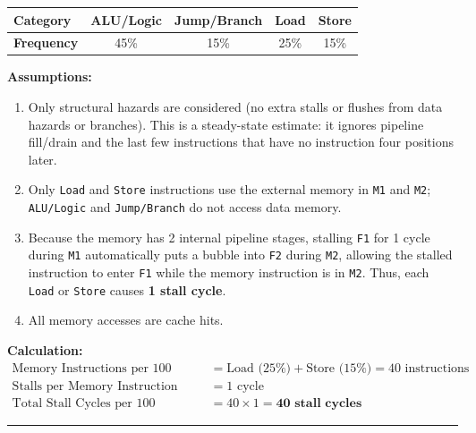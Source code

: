\documentclass[11pt, a4paper]{article}
\begin{document}
\begin{center}
\begin{tabular}{@{}l c c c c@{}}
\toprule
\textbf{Category} & \textbf{ALU/Logic} & \textbf{Jump/Branch} & \textbf{Load} & \textbf{Store} \\
\midrule
\textbf{Frequency} & 45\% & 15\% & 25\% & 15\% \\
\bottomrule
\end{tabular}
\end{center}

\textbf{Assumptions:}
\begin{enumerate}[noitemsep, topsep=2pt]
    \item Only structural hazards are considered (no extra stalls or flushes from data hazards or branches). This is a steady-state estimate: it ignores pipeline fill/drain and the last few instructions that have no instruction four positions later.
    \item Only \texttt{Load} and \texttt{Store} instructions use the external memory in \texttt{M1} and \texttt{M2}; \texttt{ALU/Logic} and \texttt{Jump/Branch} do not access data memory.
    \item Because the memory has 2 internal pipeline stages, stalling \texttt{F1} for 1 cycle during \texttt{M1} automatically puts a bubble into \texttt{F2} during \texttt{M2}, allowing the stalled instruction to enter \texttt{F1} while the memory instruction is in \texttt{M2}. Thus, each \texttt{Load} or \texttt{Store} causes \textbf{1 stall cycle}.
    \item All memory accesses are cache hits.
\end{enumerate}

\textbf{Calculation:}
\begin{align*}
    \text{Memory Instructions per 100 Instructions} &= \text{Load (25\%)} + \text{Store (15\%)} = 40\text{ instructions} \\
    \text{Stalls per Memory Instruction} &= 1\text{ cycle} \\
    \text{Total Stall Cycles per 100 Instructions} &= 40 \times 1 = \mathbf{40\text{ stall cycles}}
\end{align*}

\vspace{8pt}
\hrule
\vspace{8pt}

\newpage
\newcommand{\showdiag}[1]{%
    \begin{center}
        \resizebox{\textwidth}{!}{}
    \end{center}
}
\end{document}
